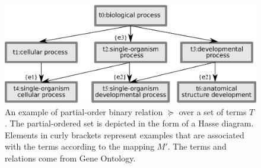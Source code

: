 \documentclass{bmcart}
\begin{document}
\begin{backmatter}





\begin{figure}[h!]
\caption{\csentence{} An example of partial-order binary relation $\succeq$ over a set of terms $T$. The partial-ordered set is depicted in the form of a Hasse diagram. Elements in curly brackets represent examples that are associated with the terms according to the mapping $M'$. The terms and relations come from Gene Ontology.}
\label{figure:onto1}
\includegraphics{Fig1.eps}
\end{figure}


\end{backmatter}
\end{document}
